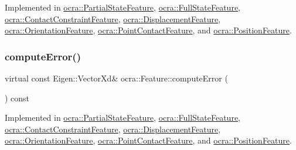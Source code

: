 Implemented in \hyperlink{classocra_1_1PartialStateFeature_af109d0d3c367db31f45f46fcc7c669c8}{ocra\+::\+Partial\+State\+Feature}, \hyperlink{classocra_1_1FullStateFeature_ab1b5ffc62eba180926f7b90e6318ee6f}{ocra\+::\+Full\+State\+Feature}, \hyperlink{classocra_1_1ContactConstraintFeature_a2d5b3c766e22c541e416ca52d14e78df}{ocra\+::\+Contact\+Constraint\+Feature}, \hyperlink{classocra_1_1DisplacementFeature_a61d1caacf56e60bb3f33d2c91d5b89f2}{ocra\+::\+Displacement\+Feature}, \hyperlink{classocra_1_1OrientationFeature_a013b77e19c995ce9eaf8b76463b8edc7}{ocra\+::\+Orientation\+Feature}, \hyperlink{classocra_1_1PointContactFeature_a6d9c92bc50784f7ecd8dda683d32b7aa}{ocra\+::\+Point\+Contact\+Feature}, and \hyperlink{classocra_1_1PositionFeature_af347aeca5c5f531f8cae97311515814e}{ocra\+::\+Position\+Feature}.

\hypertarget{classocra_1_1Feature_a88f87b496aedc7bf9f13b19bb8f9c7fa}{}\label{classocra_1_1Feature_a88f87b496aedc7bf9f13b19bb8f9c7fa} 
\subsubsection{\texorpdfstring{compute\+Error()}{computeError()}\hspace{0.1cm}{\footnotesize\ttfamily [2/2]}}
{\footnotesize\ttfamily virtual const Eigen\+::\+Vector\+Xd\& ocra\+::\+Feature\+::compute\+Error (\begin{DoxyParamCaption}{ }\end{DoxyParamCaption}) const\hspace{0.3cm}{\ttfamily [pure virtual]}}



Implemented in \hyperlink{classocra_1_1PartialStateFeature_a7d412f45a1ae3ce72a82cee84cdddc7e}{ocra\+::\+Partial\+State\+Feature}, \hyperlink{classocra_1_1FullStateFeature_a8a8e1a72f3aa7b417b5d347eaee69ebb}{ocra\+::\+Full\+State\+Feature}, \hyperlink{classocra_1_1ContactConstraintFeature_ae846fba34c59502db6cf0a0dac0e6be3}{ocra\+::\+Contact\+Constraint\+Feature}, \hyperlink{classocra_1_1DisplacementFeature_ac0520f1a870558227ba6d5339a243414}{ocra\+::\+Displacement\+Feature}, \hyperlink{classocra_1_1OrientationFeature_a0663495ff0bd6a9b01330ce4372b56ab}{ocra\+::\+Orientation\+Feature}, \hyperlink{classocra_1_1PointContactFeature_ab8504be30483fdcbeb25f9003a34471b}{ocra\+::\+Point\+Contact\+Feature}, and \hyperlink{classocra_1_1PositionFeature_a5f89935f4b2f1b420e1dec19ed6692b5}{ocra\+::\+Position\+Feature}.

